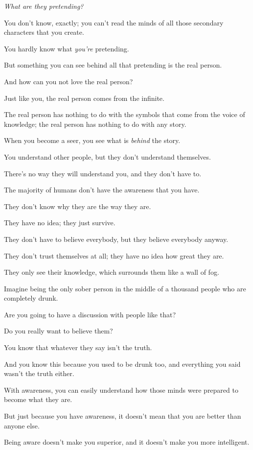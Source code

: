 \documentclass{article}
\numberwithin{equation}{section}
\begin{document}
\textit{What are they pretending?}

You don't know, exactly; you can't read the minds of all those secondary characters that you create.

You hardly know what \textit{you're} pretending.

But something you can see behind all that pretending is the real person.

And how can you not love the real person?

Just like you, the real person comes from the infinite.

The real person has nothing to do with the symbols that come from the voice of knowledge; the real person has nothing to do with any story.

%
When you become a seer, you see what is \textit{behind} the story.

You understand other people, but they don't understand themselves.

There's no way they will understand you, and they don't have to.

The majority of humans don't have the awareness that you have.

They don't know why they are the way they are.

They have no idea; they just survive.

They don't have to believe everybody, but they believe everybody anyway.

They don't trust themselves at all; they have no idea how great they are.

They only see their knowledge, which surrounds them like a wall of fog.

Imagine being the only sober person in the middle of a thousand people who are completely drunk.

Are you going to have a discussion with people like that?

Do you really want to believe them?

You know that whatever they say isn't the truth.

And you know this because you used to be drunk too, and everything you said wasn't the truth either.

%
With awareness, you can easily understand how those minds were prepared to become what they are.

But just because you have awareness, it doesn't mean that you are better than anyone else.

Being aware doesn't make you superior, and it doesn't make you more intelligent.
\end{document}
